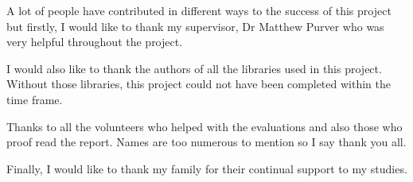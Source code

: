 
\cleardoublepage


\begin{acknowledgements}
A lot of people have contributed in different ways to the success of this project but firstly, I
would like to thank my supervisor, Dr Matthew Purver who was very helpful throughout the project.

I would also like to thank the authors of all the libraries used in this project. Without those
libraries, this project could not have been completed within the time frame.

Thanks to all the volunteers who helped with the evaluations and also those who proof read the report.
Names are too numerous to mention so I say thank you all.

Finally, I would like to thank my family for their continual support to my studies. 
\end{acknowledgements}
